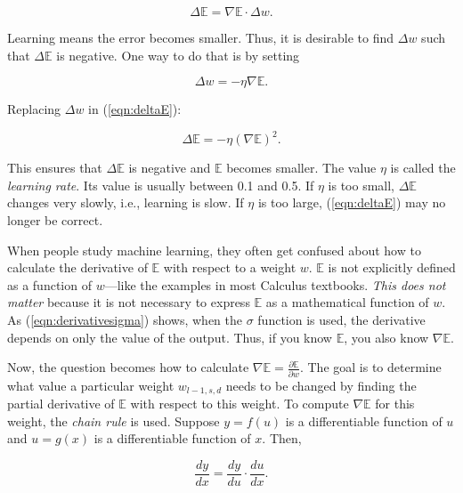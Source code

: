 \begin{equation}
\Delta \mathds{E} = \nabla \mathds{E} \cdot \Delta w.
\label{eqn:deltaE}
\end{equation}

Learning means the error becomes smaller. Thus, it is desirable to
find $\Delta w$ such that $\Delta \mathds{E}$ is negative.
One way to do that is by setting

\begin{equation}
\Delta w = - \eta \nabla \mathds{E}.
\end{equation}

Replacing $\Delta w$ in (\ref{eqn:deltaE}):

\begin{equation}
\Delta \mathds{E} = - \eta (\nabla \mathds{E})^2.
\end{equation}

This ensures that $\Delta \mathds{E}$ is negative and $\mathds{E}$
becomes smaller.  The value $\eta$ is called the {\it learning rate}.
Its value is usually between 0.1 and 0.5.  If $\eta$ is too small,
$\Delta \mathds{E}$ changes very slowly, i.e., learning is slow.  If
$\eta$ is too large, (\ref{eqn:deltaE}) may no longer be correct.

When people study machine learning, they often get confused about how
to calculate the derivative of $\mathds{E}$ with respect to a weight
$w$.  $\mathds{E}$ is not explicitly defined as a function of
$w$---like the examples in most Calculus textbooks.  {\it This does
not matter} because it is not necessary to express $\mathds{E}$ as a
mathematical function of $w$.  As (\ref{eqn:derivativesigma}) shows,
when the $\sigma$ function is used, the derivative depends on only the
value of the output.  Thus, if you know  $\mathds{E}$,
you also know $\nabla \mathds{E}$.

Now, the question becomes how to calculate $\nabla \mathds{E}
= \frac{\partial \mathds{E}}{\partial w}$.  The goal is to determine
what value a particular weight $w_{l-1, s, d}$ needs to be changed by
finding the partial derivative of $\mathds{E}$ with respect to this
weight.  To compute $\nabla \mathds{E}$ for this weight, the {\it
chain rule} is used.  Suppose $y = f(u)$ is a differentiable function
of $u$ and $u = g(x)$ is a differentiable function of $x$. Then,

\begin{equation}
\frac{dy}{dx} = \frac{dy}{du} \cdot \frac{du}{dx}.
\end{equation}

